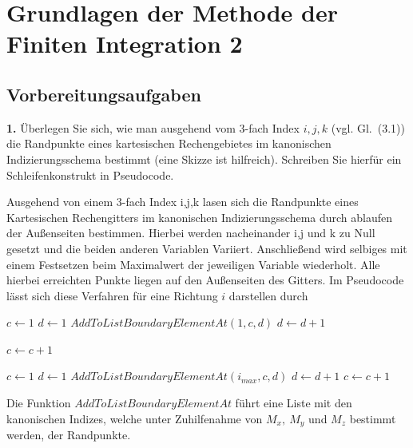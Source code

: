 \documentclass[Protokollheft.tex]{subfiles}
\begin{document}
\chapter{Grundlagen der Methode der Finiten Integration 2}

\section{Vorbereitungsaufgaben}

\begin{framed}
	\noindent \textbf{1.} Überlegen Sie sich, wie man ausgehend vom 3-fach Index $i,j,k$ (vgl. Gl.~(3.1)) die Randpunkte eines kartesischen Rechengebietes im kanonischen Indizierungsschema bestimmt (eine Skizze ist hilfreich). Schreiben Sie hierfür ein Schleifenkonstrukt in Pseudocode.\label{exer:boundIdx}
\end{framed}


Ausgehend von einem 3-fach Index i,j,k lasen sich die Randpunkte eines Kartesischen Rechengitters im kanonischen Indizierungsschema durch ablaufen der Außenseiten bestimmen. Hierbei werden nacheinander i,j und k zu Null gesetzt und die beiden anderen Variablen Variiert. Anschließend wird selbiges mit einem Festsetzen beim Maximalwert der jeweiligen Variable wiederholt. Alle hierbei erreichten Punkte liegen auf den Außenseiten des Gitters. 
\noindent
Im Pseudocode lässt sich diese Verfahren für eine Richtung $i$ darstellen durch

\begin{algorithmic}[1]
	\STATE $c \leftarrow 1$
	\STATE $d \leftarrow 1$
		\STATE $AddToListBoundaryElementAt(1,c,d)$
		\STATE $d \leftarrow d+1$
	\ENDWHILE
	
	\STATE $c \leftarrow c+1$
	\ENDWHILE
	
	\STATE $c \leftarrow 1$
	\STATE $d \leftarrow 1$
	\STATE $AddToListBoundaryElementAt(i_{max},c,d)$
	\STATE $d \leftarrow d+1$
	\ENDWHILE	
	\STATE	$c \leftarrow c+1$
	\ENDWHILE
	
\end{algorithmic}
\noindent
Die Funktion $AddToListBoundaryElementAt$ führt eine Liste mit den kanonischen Indizes, welche unter Zuhilfenahme von $M_x,\ M_y$ und $M_z$ bestimmt werden, der Randpunkte.  
\end{document}
